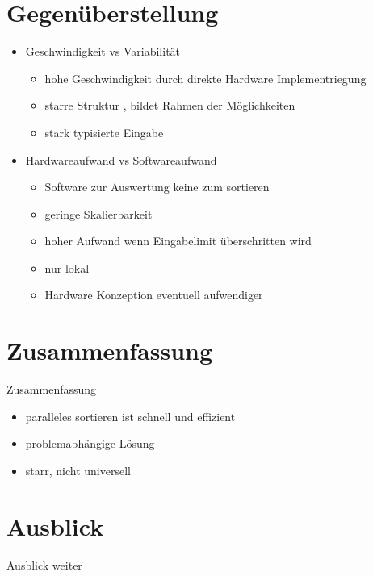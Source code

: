 \documentclass[ucs,9pt]{beamer}
\begin{document}
\section{Gegenüberstellung}
\begin{frame}
    \begin{itemize}
        \item Geschwindigkeit vs Variabilität
        \begin{itemize}
            \item hohe Geschwindigkeit durch direkte Hardware Implementriegung
            \item starre Struktur , bildet Rahmen der Möglichkeiten
            \item stark typisierte Eingabe
        \end{itemize}
    \item Hardwareaufwand vs Softwareaufwand
        \begin{itemize}
            \item Software zur Auswertung keine zum sortieren
            \item geringe Skalierbarkeit
            \item hoher Aufwand wenn Eingabelimit überschritten wird
            \item nur lokal
            \item Hardware Konzeption eventuell aufwendiger
        \end{itemize}
       
        
    \end{itemize}
\end{frame}

\section{Zusammenfassung}
\begin{frame}{Zusammenfassung}
\begin{itemize}
  \item paralleles sortieren ist schnell und effizient 
  \item problemabhängige Lösung
  \item starr, nicht universell
\end{itemize}
\end{frame}

\section{Ausblick}
\begin{frame}{Ausblick}
weiter
\end{frame}
\end{document}

